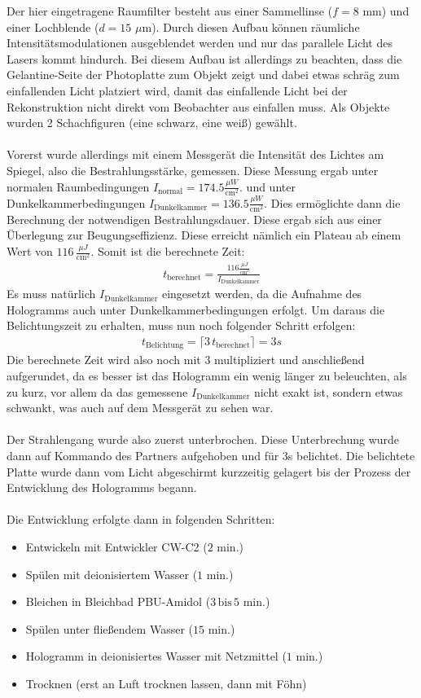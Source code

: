 \documentclass[german,  %
parskip=full,  %
]{scrartcl}
\begin{document}
Der hier eingetragene Raumfilter besteht aus einer Sammellinse ($f = 8$ mm) und einer Lochblende ($d=15$ $\mu$m). Durch diesen Aufbau können räumliche Intensitätsmodulationen ausgeblendet werden und nur das parallele Licht des Lasers kommt hindurch. Bei diesem Aufbau ist allerdings zu beachten, dass die Gelantine-Seite der Photoplatte zum Objekt zeigt und dabei etwas schräg zum einfallenden Licht platziert wird, damit das einfallende Licht bei der Rekonstruktion nicht direkt vom Beobachter aus einfallen muss. Als Objekte wurden 2 Schachfiguren (eine schwarz, eine weiß) gewählt.
\\\\
Vorerst wurde allerdings mit einem Messgerät die Intensität des Lichtes am Spiegel, also die Bestrahlungsstärke, gemessen.
Diese Messung ergab unter normalen Raumbedingungen $I_{\mathrm{normal}} = 174.5 \frac{\mu W}{\mathrm{cm}^2}$.
und unter Dunkelkammerbedingungen $I_{\mathrm{Dunkelkammer}} = 136.5 \frac{\mu W}{\mathrm{cm}^2}$.
Dies ermöglichte dann die Berechnung der notwendigen Bestrahlungsdauer. Diese ergab sich aus einer Überlegung zur Beugungseffizienz. Diese erreicht nämlich ein Plateau ab einem Wert von $116 \, \frac{\mu J}{\mathrm{cm}^2}$. Somit ist die berechnete Zeit:
\begin{align}
t_{\mathrm{berechnet}} = \frac{116 \frac{\mu J}{\mathrm{cm}^2}}{I_{\mathrm{Dunkelkammer}}}
\end{align}
Es muss natürlich $I_{\mathrm{Dunkelkammer}}$ eingesetzt werden, da die Aufnahme des Hologramms auch unter Dunkelkammerbedingungen erfolgt. Um daraus die Belichtungszeit zu erhalten, muss nun noch folgender Schritt erfolgen:
\begin{align}
t_{\mathrm{Belichtung}} = \lceil{3 \, t_{\mathrm{berechnet}}} \rceil = 3s
\end{align}
Die berechnete Zeit wird also noch mit $3$ multipliziert und anschließend aufgerundet, da es besser ist das Hologramm ein wenig länger zu beleuchten, als zu kurz, vor allem da das gemessene $I_{\mathrm{Dunkelkammer}}$ nicht exakt ist, sondern etwas schwankt, was auch auf dem Messgerät zu sehen war.
\\\\
Der Strahlengang wurde also zuerst unterbrochen. Diese Unterbrechung wurde dann auf Kommando des Partners aufgehoben und für $3$s belichtet. Die belichtete Platte wurde dann vom Licht abgeschirmt kurzzeitig gelagert bis der Prozess der Entwicklung des Hologramms begann.
\\\\
Die Entwicklung erfolgte dann in folgenden Schritten:
\begin{itemize}
\item Entwickeln mit Entwickler CW-C2 ($2$ min.)
\item Spülen mit deionisiertem Wasser ($1$ min.)
\item Bleichen in Bleichbad PBU-Amidol ($3 \, \text{bis} \, 5$ min.)
\item Spülen unter fließendem Wasser ($15$ min.)
\item Hologramm in deionisiertes Wasser mit Netzmittel ($1$ min.)
\item Trocknen (erst an Luft trocknen lassen, dann mit Föhn)
\end{itemize}
\end{document}
